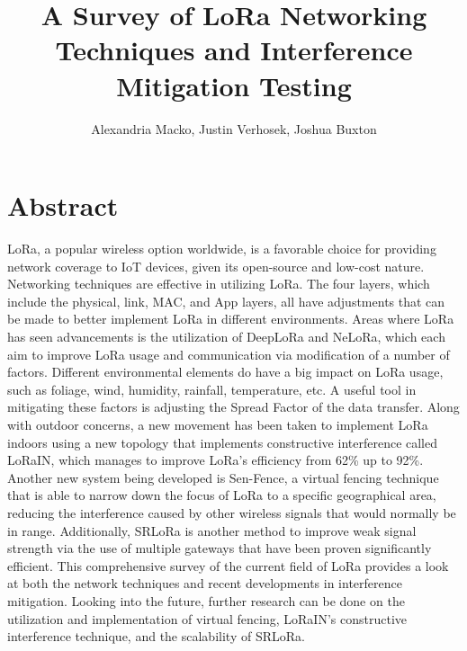 \documentclass[sigsmall]{acmart}
\title{A Survey of LoRa Networking Techniques and Interference Mitigation Testing}
\author{Alexandria Macko, Justin Verhosek, Joshua Buxton}
\begin{document}
\maketitle
\section*{Abstract}
LoRa, a popular wireless option worldwide, is a favorable choice for providing network coverage to IoT devices, given its open-source and low-cost nature. Networking techniques are effective in utilizing LoRa. The four layers, which include the physical, link, MAC, and App layers, all have adjustments that can be made to better implement LoRa in different environments. Areas where LoRa has seen advancements is the utilization of DeepLoRa and NeLoRa, which each aim to improve LoRa usage and communication via modification of a number of factors. Different environmental elements do have a big impact on LoRa usage, such as foliage, wind, humidity, rainfall, temperature, etc. A useful tool in mitigating these factors is adjusting the Spread Factor of the data transfer. Along with outdoor concerns, a new movement has been taken to implement LoRa indoors using a new topology that implements constructive interference called LoRaIN, which manages to improve LoRa’s efficiency from 62\% up to 92\%. Another new system being developed is Sen-Fence, a virtual fencing technique that is able to narrow down the focus of LoRa to a specific geographical area, reducing the interference caused by other wireless signals that would normally be in range. Additionally, SRLoRa is another method to improve weak signal strength via the use of multiple gateways that have been proven significantly efficient. This comprehensive survey of the current field of LoRa provides a look at both the network techniques and recent developments in interference mitigation. Looking into the future, further research can be done on the utilization and implementation of virtual fencing, LoRaIN’s constructive interference technique, and the scalability of SRLoRa. 
\end{document}
